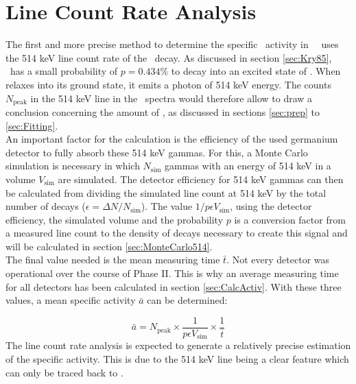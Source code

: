 \documentclass[encoding=utf8,british]{tumphthesis}
\begin{document}
 
\chapter{Line Count Rate Analysis}
\label{sec:SAfrom514}

The first and more precise method to determine the specific \Kr\ activity in \gerda\ \PII\ uses the 514 keV line count rate of the \Kr\ decay.
As discussed in section \ref{sec:Kry85}, \Kr\ has a small probability of $p=0.434\%$ to decay into an excited state of . 
When  relaxes into its ground state, it emits a photon of 514 keV energy.
The counts $N_{\mathrm{peak}}$ in the 514 keV line in the \gerda\ spectra would therefore allow to draw a conclusion concerning the amount of \Kr, as discussed in sections \ref{sec:prep} to \ref{sec:Fitting}. 
\\

An important factor for the calculation is the efficiency of the used germanium detector to fully absorb these 514 keV gammas.
For this, a Monte Carlo simulation is necessary in which $N_{\mathrm{sim}}$ gammas with an energy of 514 keV  in a  volume $V_{\mathrm{sim}}$ are simulated.
The detector efficiency for 514 keV gammas can then be calculated from dividing the simulated line count at 514 keV by the total number of  decays ($\epsilon = \Delta N/N_{\mathrm{sim}}$).
The value $1/p \epsilon V_{\mathrm{sim}}$, using the detector efficiency, the simulated volume and the probability $p$ is a conversion factor from a measured line count to the density of decays necessary to create this signal and will be calculated in section \ref{sec:MonteCarlo514}.
\\

The final value needed is the mean measuring time $\bar{t}$.
Not every detector was operational over the course of Phase II.
This is why an average measuring time for all detectors has been calculated in section \ref{sec:CalcActiv}.
With these three values, a mean specific activity $\bar{a}$ can be determined:

\begin{equation}
    \bar{a} = N_{\mathrm{peak}}\times\frac{1}{p \epsilon V_{\mathrm{sim}}}\times\frac{1}{\bar{t}}
    \label{equ:activityDieErste}
\end{equation}
The line count rate analysis is expected to generate a relatively precise estimation of the specific activity.
This is due to the 514 keV line being a clear feature which can only be traced back to \Kr.
\\
\end{document}
